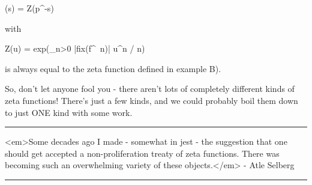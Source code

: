 \zeta (s) = Z(p^{-s})

with 

Z(u) = exp(\sum_{n>0} |fix(f^{\ n})| u^{n} / n)

is always equal to the zeta function defined in example B).

So, don't let anyone fool you - there aren't lots of completely
different kinds of zeta functions!  There's just a few kinds, and 
we could probably boil them down to just ONE kind with some work.







\par\noindent\rule{\textwidth}{0.4pt}
<em>Some decades ago I made - somewhat in jest - the suggestion that one should 
get accepted a non-proliferation treaty of zeta functions.  There was 
becoming such an overwhelming variety of these objects.</em> - Atle Selberg

\par\noindent\rule{\textwidth}{0.4pt}


